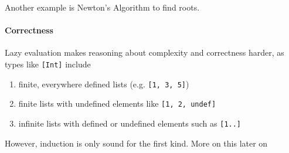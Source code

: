 Another example is Newton's Algorithm to find roots.


\paragraph{Correctness}
Lazy evaluation makes reasoning about complexity and correctness harder, as types like \texttt{[Int]} include
\begin{enumerate}
    \item finite, everywhere defined lists (e.g. \texttt{[1, 3, 5]})
    \item finite lists with undefined elements like \texttt{[1, 2, undef]}
    \item infinite lists with defined or undefined elements such as \texttt{[1..]}
\end{enumerate}

However, induction is only sound for the first kind. More on this later on

